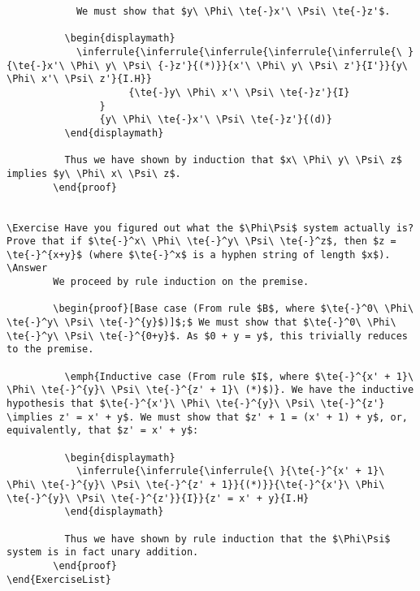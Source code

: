 \documentclass{book}
\begin{document}
\begin{verbatim}
            We must show that $y\ \Phi\ \te{-}x'\ \Psi\ \te{-}z'$. 
          
          \begin{displaymath}            
            \inferrule{\inferrule{\inferrule{\inferrule{\inferrule{\ }{\te{-}x'\ \Phi\ y\ \Psi\ {-}z'}{(*)}}{x'\ \Phi\ y\ \Psi\ z'}{I'}}{y\ \Phi\ x'\ \Psi\ z'}{I.H}}
                     {\te{-}y\ \Phi\ x'\ \Psi\ \te{-}z'}{I}
                }
                {y\ \Phi\ \te{-}x'\ \Psi\ \te{-}z'}{(d)}
          \end{displaymath}
          
          Thus we have shown by induction that $x\ \Phi\ y\ \Psi\ z$ implies $y\ \Phi\ x\ \Psi\ z$.
        \end{proof}
        
      
\Exercise Have you figured out what the $\Phi\Psi$ system actually is? Prove that if $\te{-}^x\ \Phi\ \te{-}^y\ \Psi\ \te{-}^z$, then $z = \te{-}^{x+y}$ (where $\te{-}^x$ is a hyphen string of length $x$). 
\Answer
        We proceed by rule induction on the premise.
        
        \begin{proof}[Base case (From rule $B$, where $\te{-}^0\ \Phi\ \te{-}^y\ \Psi\ \te{-}^{y}$)]$;$ We must show that $\te{-}^0\ \Phi\ \te{-}^y\ \Psi\ \te{-}^{0+y}$. As $0 + y = y$, this trivially reduces to the premise.
          
          \emph{Inductive case (From rule $I$, where $\te{-}^{x' + 1}\ \Phi\ \te{-}^{y}\ \Psi\ \te{-}^{z' + 1}\ (*)$)}. We have the inductive hypothesis that $\te{-}^{x'}\ \Phi\ \te{-}^{y}\ \Psi\ \te{-}^{z'} \implies z' = x' + y$. We must show that $z' + 1 = (x' + 1) + y$, or, equivalently, that $z' = x' + y$:
          
          \begin{displaymath}
            \inferrule{\inferrule{\inferrule{\ }{\te{-}^{x' + 1}\ \Phi\ \te{-}^{y}\ \Psi\ \te{-}^{z' + 1}}{(*)}}{\te{-}^{x'}\ \Phi\ \te{-}^{y}\ \Psi\ \te{-}^{z'}}{I}}{z' = x' + y}{I.H}
          \end{displaymath}
          
          Thus we have shown by rule induction that the $\Phi\Psi$ system is in fact unary addition.
        \end{proof}
\end{ExerciseList}

\end{verbatim}
\end{document}
